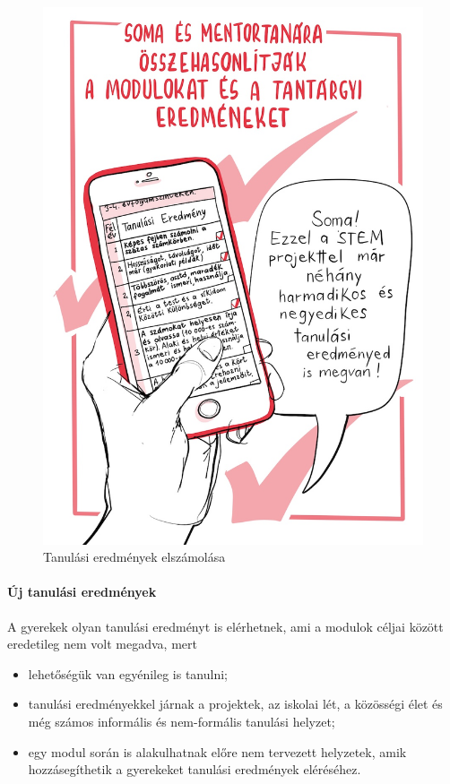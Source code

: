 \begin{figure}
\centering
\includegraphics{pics/6a_tantargyi_soma.jpg}
\caption{Tanulási eredmények elszámolása}
\end{figure}

\hypertarget{uj-tanulasi-eredmenyek}{%
\paragraph{Új tanulási eredmények}\label{uj-tanulasi-eredmenyek}}

A gyerekek olyan tanulási eredményt is elérhetnek, ami a modulok céljai
között eredetileg nem volt megadva, mert

\begin{itemize}
\item
  lehetőségük van egyénileg is tanulni;
\item
  tanulási eredményekkel járnak a projektek, az iskolai lét, a közösségi
  élet és még számos informális és nem-formális tanulási helyzet;
\item
  egy modul során is alakulhatnak előre nem tervezett helyzetek,\break
  amik
  hozzásegíthetik a gyerekeket tanulási eredmények eléréséhez.
\end{itemize}

